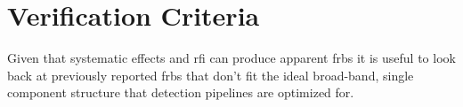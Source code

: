 \documentclass[a4paper,fleqn,usenatbib]{mnras}
\begin{document}
\section{Verification Criteria}
\label{sec:verify_crit}

Given that systematic effects and \gls{rfi} can produce apparent \glspl{frb} it
is useful to look back at previously reported \glspl{frb} that don't fit the
ideal broad-band, single component structure that detection pipelines are
optimized for.

\end{document}

